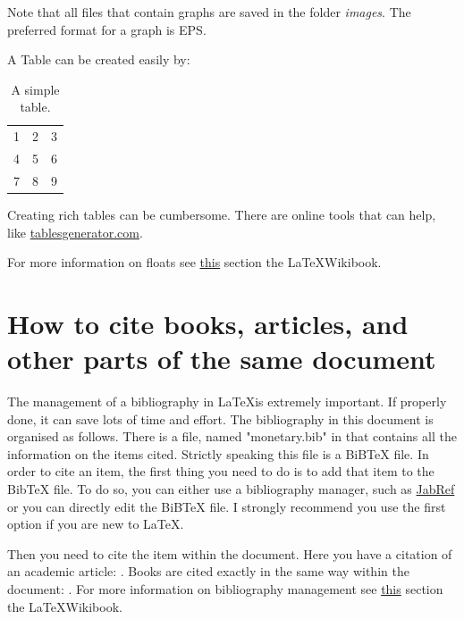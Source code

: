 \documentclass[11pt,a4paper,oneside]{book}
\newcommand{\latex}{\LaTeX{}} %
\begin{document}
Note that all files that contain graphs are saved in the folder \textit{images}. The preferred format for a graph is EPS.

A Table can be created easily by:
\begin{table}[h!]
  \centering
    \begin{tabular}{| l c r |}
    \hline
    1 & 2 & 3 \\
    4 & 5 & 6 \\
    7 & 8 & 9 \\
    \hline
    \end{tabular}
  \caption{A simple table.}
  \label{tab:simple_table}
\end{table}

Creating rich tables can be cumbersome. There are online tools that can help, like \href{https://www.tablesgenerator.com/}{tablesgenerator.com}.

For more information on floats see \href{https://en.wikibooks.org/wiki/LaTeX/Floats,_Figures_and_Captions}{this} section the \latex Wikibook.

\section{How to cite books, articles, and other parts of the same document}
\label{sec:citations}
The management of a bibliography in \latex is extremely important. If properly done, it can save lots of time and effort. The bibliography in this document is organised as follows. There is a file, named "monetary.bib" in that contains all the information on the items cited. Strictly speaking this file is a BiBTeX file. In order to cite an item, the first thing you need to do is to add that item to the BibTeX file. To do so, you can either use a bibliography manager, such as \href{http://www.jabref.org/}{JabRef} or you can directly edit the BiBTeX file. I strongly recommend you use the first option if you are new to \latex.

Then you need to cite the item within the document. Here you have a citation of an academic article: \citet*{Cooley_Hansen_1989}. Books are cited exactly in the same way within the document: \citet*{Blanchard_2017}. For more information on bibliography management see \href{https://en.wikibooks.org/wiki/LaTeX/Bibliography_Management}{this} section the \latex Wikibook.
\end{document}
